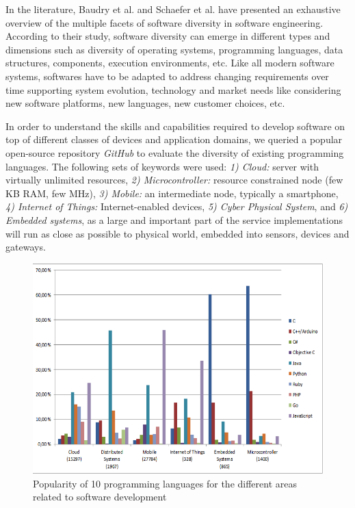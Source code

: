 In the literature, Baudry et al.\cite{baudry2015multiple} and Schaefer et al.\cite{schaefer2012software} have presented an exhaustive overview of the multiple facets of software diversity in software engineering. 
According to their study, software diversity can emerge in different types and dimensions such as diversity of operating systems, programming languages, data structures, components, execution environments, etc. 
Like all modern software systems, softwares have to be adapted to address changing requirements over time supporting system evolution, technology and market needs like considering new software platforms, new languages, new customer choices, etc.

In order to understand the skills and capabilities required to develop software on top of different classes of devices and application domains, we queried a popular open-source repository \textit{GitHub} to evaluate the diversity of existing programming languages.  
The following sets of keywords were used: \textit{1) Cloud:} server with virtually unlimited resources, \textit{2) Microcontroller:} resource constrained node (few KB RAM, few MHz),  \textit{3) Mobile:} an intermediate node, typically a smartphone,  \textit{4) Internet of Things:} Internet-enabled devices,  \textit{5) Cyber Physical System}, and  \textit{6) Embedded systems}, as a large and important part of the service implementations will run as close as possible to physical world, embedded into sensors, devices and gateways.

\begin{figure}[h]
	\center
	\includegraphics[scale=1.]{Background/fig/github}
	\caption{Popularity of 10 programming languages for the different areas related to software development}
	\label{fig:github}
\end{figure}

